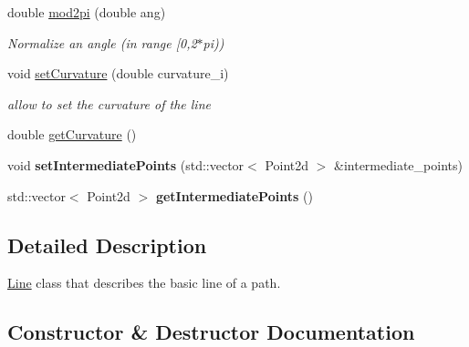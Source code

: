 \begin{DoxyCompactItemize}
double \mbox{\hyperlink{class_path2_d_1_1_element_1_1_line_acf0f091fc601933343d71f166932e109}{mod2pi}} (double ang)
\begin{DoxyCompactList}\small\item\em Normalize an angle (in range \mbox{[}0,2$\ast$pi)) \end{DoxyCompactList}\item 
\mbox{\label{class_path2_d_1_1_element_1_1_line_ad2ca1d21a7917a57340813ad742bd81d}} 
void \mbox{\hyperlink{class_path2_d_1_1_element_1_1_line_ad2ca1d21a7917a57340813ad742bd81d}{set\+Curvature}} (double curvature\+\_\+i)
\begin{DoxyCompactList}\small\item\em allow to set the curvature of the line \end{DoxyCompactList}\item 
double \mbox{\hyperlink{class_path2_d_1_1_element_1_1_line_a837b53f6b6604ddbd40b16842897961b}{get\+Curvature}} ()
\item 
\mbox{\label{class_path2_d_1_1_element_1_1_line_a61f99c8af2a6c1bc08653159df510f0f}} 
void {\bfseries set\+Intermediate\+Points} (std\+::vector$<$ Point2d $>$ \&intermediate\+\_\+points)
\item 
\mbox{\label{class_path2_d_1_1_element_1_1_line_a455a0a414cee38680e06433247e6fa01}} 
std\+::vector$<$ Point2d $>$ {\bfseries get\+Intermediate\+Points} ()
\end{DoxyCompactItemize}


\subsection{Detailed Description}
\mbox{\hyperlink{class_path2_d_1_1_element_1_1_line}{Line}} class that describes the basic line of a path. 

\subsection{Constructor \& Destructor Documentation}
\mbox{\label{class_path2_d_1_1_element_1_1_line_a88244ad1861298c071c3f63b6726fad2}} 
